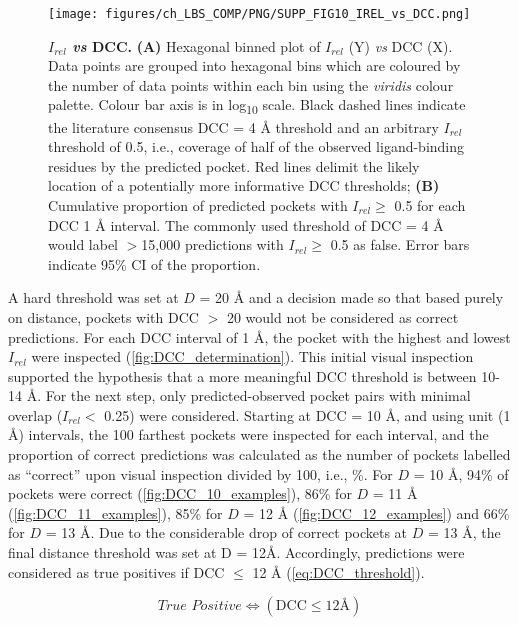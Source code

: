 \begin{figure}[htb!]
    \centering
    \texttt{[image: figures/ch\_LBS\_COMP/PNG/SUPP\_FIG10\_IREL\_vs\_DCC.png]}
    \caption[$I_{rel}$ \textit{vs} DCC]{\textbf{$I_{rel}$ \textit{vs} DCC.} \textbf{(A)} Hexagonal binned plot of $I_{rel}$ (Y) \textit{vs} DCC (X). Data points are grouped into hexagonal bins which are coloured by the number of data points within each bin using the \textit{viridis} colour palette. Colour bar axis is in log\textsubscript{10} scale. Black dashed lines indicate the literature consensus DCC = 4 \AA{} threshold and an arbitrary $I_{rel}$ threshold of 0.5, i.e., coverage of half of the observed ligand-binding residues by the predicted pocket.  Red lines delimit the likely location of a potentially more informative DCC thresholds; \textbf{(B)} Cumulative proportion of predicted pockets with $I_{rel} \geq$ 0.5 for each DCC 1 \AA{} interval. The commonly used threshold of DCC = 4 \AA{} would label $>$15,000 predictions with $I_{rel} \geq$ 0.5 as false. Error bars indicate 95\% CI of the proportion.}
    \label{fig:irel_vs_dcc}
\end{figure}

A hard threshold was set at $D$ = 20 \AA{} and a decision made so that based purely on distance, pockets with DCC $>$ 20 would not be considered as correct predictions. For each DCC interval of 1 \AA{}, the pocket with the highest and lowest $I_{rel}$ were inspected (\autoref{fig:DCC_determination}). This initial visual inspection supported the hypothesis that a more meaningful DCC threshold is between 10-14 \AA{}. For the next step, only predicted-observed pocket pairs with minimal overlap ($I_{rel} <$ 0.25) were considered. Starting at DCC = 10 \AA{}, and using unit (1 \AA{}) intervals, the 100 farthest pockets were inspected for each interval, and the proportion of correct predictions was calculated as the number of pockets labelled as ``correct'' upon visual inspection divided by 100, i.e., \%. For $D$ = 10 \AA{}, 94\% of pockets were correct (\autoref{fig:DCC_10_examples}), 86\% for $D$ = 11 \AA{} (\autoref{fig:DCC_11_examples}), 85\% for $D$ = 12 \AA{} (\autoref{fig:DCC_12_examples}) and 66\% for $D$ = 13 \AA{}. Due to the considerable drop of correct pockets at $D$ = 13 \AA{}, the final distance threshold was set at D = 12\AA{}. Accordingly, predictions were considered as true positives if DCC $\leq$ 12 \AA{} (\autoref{eq:DCC_threshold}).

\begin{equation}
\textit{True Positive} \iff (\text{DCC} \leq 12\text{\AA{}})
\label{eq:DCC_threshold}
\end{equation}

